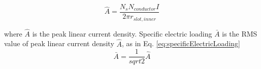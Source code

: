 \documentclass[a4paper, 11pt, titlepage]{article}
\begin{document}
\begin{equation}
	\hat{A}=\frac{N_sN_{conductor}I}{2\pi r_{slot,inner}}
	\label{eq:peakLinearCurrentDensity}
\end{equation}

where $\hat{A}$ is the peak linear current density. Specific electric loading $\bar{A}$ is the RMS value of peak linear current density $\hat{A}$, as in Eq. \ref{eq:specificElectricLoading}
\begin{equation}
	\bar{A}=\frac{1}{sqrt{2}}\hat{A}
	\label{eq:specificElectricLoading}
\end{equation}

\newpage

 

\end{document}
